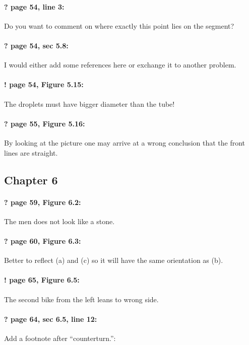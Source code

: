 \documentclass[twoside]{article}
\begin{document}
\paragraph{? page 54, line 3:} Do you want to comment on where exactly this point lies on the segment?

\paragraph{? page 54, sec 5.8:} I would either add some references here or exchange it to another problem.

\paragraph{! page 54, Figure 5.15:} The droplets must have bigger diameter than the tube!

\paragraph{? page 55, Figure 5.16:} By looking at the picture one may arrive at a wrong conclusion that the front lines are straight.

\subsection*{Chapter 6}

\paragraph{? page 59, Figure 6.2:} The men does not look like a stone.

\paragraph{? page 60, Figure 6.3:} Better to reflect (a) and (c) so it will have the same orientation as (b).

\paragraph{! page 65, Figure 6.5:} The second bike from the left leans to wrong side.

\paragraph{? page 64, sec 6.5, line 12:} Add a footnote after ``counterturn.'':
\end{document}
